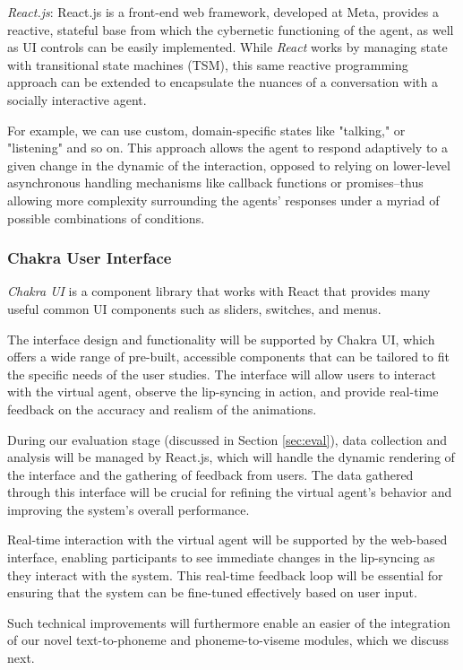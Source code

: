 \documentclass[12pt]{article}
\begin{document}
\textit{React.js}: React.js is a front-end web framework, developed at Meta, provides a reactive, stateful base from which the cybernetic functioning of the agent, as well as UI controls can be easily implemented.
While {\em React} works by managing state with transitional state machines (TSM), this same reactive programming approach can be extended to encapsulate the nuances of a conversation with a socially interactive agent. 

For example, we can use custom, domain-specific states like "talking," or "listening" and so on. This approach allows the agent to respond adaptively to a given change in the dynamic of the interaction, opposed to relying on lower-level asynchronous handling mechanisms like callback functions or promises--thus allowing more complexity surrounding the agents' responses under a myriad of possible combinations of conditions.

\subsubsection{Chakra User Interface}

{\em Chakra UI}  is a component library that works with React that provides many useful common UI components such as sliders, switches, and menus.

 The interface design and functionality will be supported by Chakra UI, which offers a wide range of pre-built, accessible components that can be tailored to fit the specific needs of the user studies. The interface will allow users to interact with the virtual agent, observe the lip-syncing in action, and provide real-time feedback on the accuracy and realism of the animations.

During our evaluation stage (discussed in Section \ref{sec:eval}), data collection and analysis will be managed by React.js, which will handle the dynamic rendering of the interface and the gathering of feedback from users. The data gathered through this interface will be crucial for refining the virtual agent’s behavior and improving the system’s overall performance. 

Real-time interaction with the virtual agent will be supported by the web-based interface, enabling participants to see immediate changes in the lip-syncing as they interact with the system. This real-time feedback loop will be essential for ensuring that the system can be fine-tuned effectively based on user input.

Such technical improvements will furthermore enable an easier of the integration of our novel text-to-phoneme and phoneme-to-viseme modules, which we discuss next.
\end{document}
